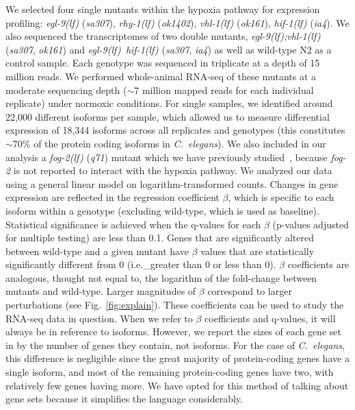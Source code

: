 \documentclass[10pt, onecolumn]{article}
\newcommand{\cel}{\emph{C.~elegans}}
\newcommand{\gene}[1]{\emph{#1}}
\newcommand{\fog}{\emph{\mbox{fog-2(lf)}}}
\newcommand{\egl}{\emph{\mbox{egl-9}(lf)}}
\newcommand{\rhy}{\emph{\mbox{rhy-1}(lf)}}
\newcommand{\vhl}{\emph{\mbox{vhl-1}(lf)}}
\newcommand{\eglvhl}{\emph{\mbox{egl-9(lf);vhl-1(lf)}}}
\newcommand{\eglhif}{\emph{\mbox{egl-9(lf)}~\mbox{hif-1(lf)}}}
\newcommand{\hif}{\emph{\mbox{hif-1(lf)}}}
\begin{document}
We selected four single mutants within the hypoxia pathway for expression profiling:
\egl{} (\emph{sa307}), \rhy{} (\emph{ok1402}), \vhl{} (\emph{ok161}), \hif{} (\emph{ia4}).
We also sequenced the transcriptomes of two double mutants, \eglvhl{} (\emph{sa307},
\emph{ok161}) and \eglhif{} (\emph{sa307}, \emph{ia4}) as well as wild-type N2 as
a control sample. Each genotype  was sequenced in triplicate at a depth of 15
million reads. We performed whole-animal RNA-seq of these mutants at a moderate
sequencing depth ($\sim7$ million mapped reads for each individual replicate)
under normoxic conditions. For single samples, we identified around 22,000 different
isoforms per sample, which allowed us to measure differential expression of 18,344
isoforms across all replicates and genotypes (this constitutes  $\sim$70\% of
the protein coding isoforms in \cel{}).
We also included in our analysis a \fog{} (\emph{q71}) mutant which we have previously
studied~\cite{Angeles-Albores2016a}, because \gene{fog-2} is not reported to
interact with the hypoxia pathway.
We analyzed our data using a general linear model on logarithm-transformed counts.
Changes in gene expression are reflected in the regression coefficient $\beta$,
which is specific to each isoform within a genotype (excluding wild-type, which
is used as baseline). Statistical significance is
achieved when the q-values for each $\beta$ (p-values adjusted for multiple
testing) are less than 0.1. Genes that are significantly altered between wild-type
and a given mutant have $\beta$ values that are statistically significantly
different from 0 (i.e.\_greater than 0 or less than 0). $\beta$ coefficients are
analogous, thought not equal to, the logarithm of the fold-change between mutants
and wild-type. Larger magnitudes of $\beta$ correspond to larger perturbations
(see Fig.~\ref{fig:explain}).
These coefficients can be used to study the RNA-seq data in question.
When we refer to $\beta$ coefficients and q-values, it will always be in
reference to isoforms. However, we report the sizes of each gene set in
by the number of genes they contain, not isoforms. For the case of \cel{}, this
difference is negligible since the great majority of protein-coding genes have
a single isoform, and most of the remaining protein-coding genes have two, with
relatively few genes having more. We have opted for this method of talking about
gene sets because it simplifies the language considerably.
\end{document}
